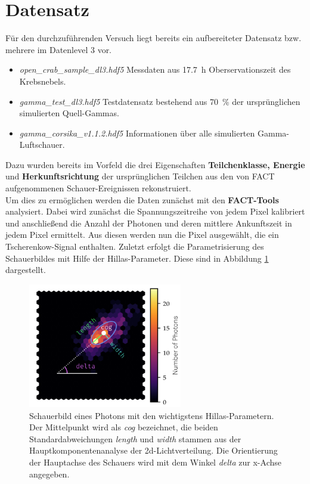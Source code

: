 \section{Datensatz}
Für den durchzuführenden Versuch liegt bereits ein aufbereiteter Datensatz bzw. mehrere im Datenlevel 3 vor.
\begin{itemize}
	\item \textit{open\_crab\_sample\_dl3.hdf5} Messdaten aus \SI{17.7}{\hour} Oberservationszeit des Krebsnebels.
	\item \textit{gamma\_test\_dl3.hdf5} Testdatensatz bestehend aus \SI{70}{\percent} der ursprünglichen simulierten Quell-Gammas.
	\item \textit{gamma\_corsika\_v1.1.2.hdf5} Informationen über alle simulierten Gamma-Luftschauer.
\end{itemize}
Dazu wurden bereits im Vorfeld die drei Eigenschaften \textbf{Teilchenklasse, Energie} und \textbf{Herkunftsrichtung} der ursprünglichen Teilchen aus den von FACT aufgenommenen Schauer-Ereignissen rekonstruiert. \\
Um dies zu ermöglichen werden die Daten zunächst mit den \textbf{FACT-Tools} \cite{kai_brugge_2018_2386762} analysiert. Dabei wird zunächst die Spannungszeitreihe von jedem Pixel kalibriert und anschließend die Anzahl der Photonen und deren mittlere Ankunftszeit in jedem Pixel ermittelt. Aus diesen werden nun die Pixel ausgewählt, die ein Tscherenkow-Signal enthalten. Zuletzt erfolgt die Parametrisierung des Schauerbildes mit Hilfe der Hillas-Parameter. Diese sind in Abbildung \ref{fig:Para} dargestellt.
\begin{figure}
	\centering
	\includegraphics[width=0.6\textwidth]{graphics/Hillas.png}
	\caption{Schauerbild eines Photons mit  den wichtigstens Hillas-Parametern. Der Mittelpunkt wird als \textit{cog} bezeichnet, die beiden Standardabweichungen \textit{length} und \textit{width} stammen aus der Hauptkomponentenanalyse der 2d-Lichtverteilung. Die Orientierung der Hauptachse des Schauers wird mit dem Winkel \textit{delta} zur x-Achse angegeben.\cite{anleitung}}
	\label{fig:Para}
\end{figure}
